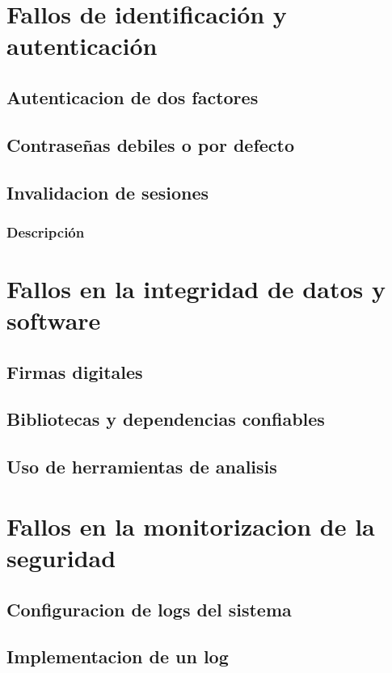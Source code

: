 \documentclass{report}
\begin{document}
        \section{Fallos de identificación y autenticación}
            \subsection{Autenticacion de dos factores}
            \subsection{Contraseñas debiles o por defecto}
            \subsection{Invalidacion de sesiones}
                    \subsubsection{Descripción}

        \clearpage
        \section{Fallos en la integridad de datos y software}
            \subsection{Firmas digitales}
            \subsection{Bibliotecas y dependencias confiables}
            \subsection{Uso de herramientas de analisis}
            \clearpage
        \section{Fallos en la monitorizacion de la seguridad}
            \subsection{Configuracion de logs del sistema}
            \subsection{Implementacion de un log}
            \clearpage
\end{document}
